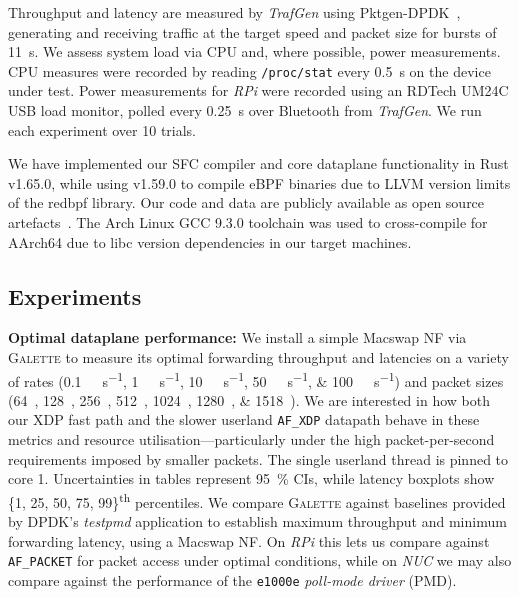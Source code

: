 \documentclass[comsoc, conference, times]{IEEEtran}
\newcommand{\ourtech}{\textsc{Galette}}
\newcommand{\afxdp}{\texttt{AF\_XDP}}
\newcommand{\afp}{\texttt{AF\_PACKET}}
\newcommand{\fakepara}[1]{\noindent\textbf{#1:}}
\begin{document}
Throughput and latency are measured by \emph{TrafGen} using Pktgen-DPDK~\parencite{pktgen-dpdk}, generating and receiving traffic at the target speed and packet size for bursts of \qty{11}{\second}.
We assess system load via CPU and, where possible, power measurements.
CPU measures were recorded by reading \texttt{/proc/stat} every \qty{0.5}{\second} on the device under test.
Power measurements for \emph{RPi} were recorded using an RDTech UM24C USB load monitor, polled every \qty{0.25}{\second} over Bluetooth from \emph{TrafGen}.
We run each experiment over \num{10} trials.

We have implemented our SFC compiler and core dataplane functionality in Rust v1.65.0, while using v1.59.0 to compile eBPF binaries due to LLVM version limits of the redbpf library.
Our code and data are publicly available as open source artefacts~\parencite{galette-repo}.
The Arch Linux GCC 9.3.0 toolchain was used to cross-compile for AArch64 due to libc version dependencies in our target machines.

\subsection{Experiments}
\fakepara{Optimal dataplane performance}
We install a simple Macswap NF via \ourtech{} to measure its optimal forwarding throughput and latencies on a variety of rates (\qtylist[list-units = single]{0.1;1;10;50;100}{\mega\bit\per\second}) and packet sizes (\qtylist[list-units = single]{64;128;256;512;1024;1280;1518}{\byte}).
We are interested in how both our XDP fast path and the slower userland \afxdp{} datapath behave in these metrics and resource utilisation---particularly under the high packet-per-second requirements imposed by smaller packets.
The single userland thread is pinned to core 1.
Uncertainties in tables represent \qty{95}{\percent} CIs, while latency boxplots show \{1, 25, 50, 75, 99\}\textsuperscript{th} percentiles.
We compare \ourtech{} against baselines provided by DPDK's \emph{testpmd} application to establish maximum throughput and minimum forwarding latency, using a Macswap NF.
On \emph{RPi} this lets us compare against \afp{} for packet access under optimal conditions, while on \emph{NUC} we may also compare against the performance of the \texttt{e1000e} \emph{poll-mode driver} (PMD).
%
\end{document}
